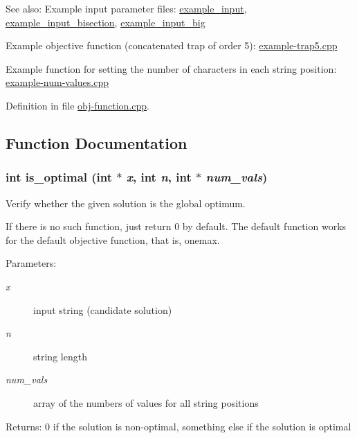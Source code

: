 \begin{Desc}
\item[See also:]Example input parameter files: \hyperlink{example__input-example}{example\_\-input}, \hyperlink{example__input__bisection-example}{example\_\-input\_\-bisection}, \hyperlink{example__input__big-example}{example\_\-input\_\-big} 

Example objective function (concatenated trap of order 5): \hyperlink{example-trap5_8cpp-example}{example-trap5.cpp} 

Example function for setting the number of characters in each string position: \hyperlink{example-num-values_8cpp-example}{example-num-values.cpp} \end{Desc}


Definition in file \hyperlink{obj-function_8cpp-source}{obj-function.cpp}.

\subsection{Function Documentation}
\hypertarget{obj-function_8cpp_39144c50109e3a793e1aecd4014ece28}{
\subsubsection[is\_\-optimal]{\setlength{\rightskip}{0pt plus 5cm}int is\_\-optimal (int $\ast$ {\em x}, int {\em n}, int $\ast$ {\em num\_\-vals})}}
\label{obj-function_8cpp_39144c50109e3a793e1aecd4014ece28}


Verify whether the given solution is the global optimum. 

If there is no such function, just return 0 by default. The default function works for the default objective function, that is, onemax.

\begin{Desc}
\item[Parameters:]
\begin{description}
\item[{\em x}]input string (candidate solution) \item[{\em n}]string length \item[{\em num\_\-vals}]array of the numbers of values for all string positions\end{description}
\end{Desc}
\begin{Desc}
\item[Returns:]0 if the solution is non-optimal, something else if the solution is optimal \end{Desc}


